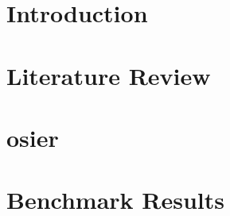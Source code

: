 \chapter{Introduction}
\chapter{Literature Review}
\label{chapter:lit-review}


\chapter{\acf{osier}}
\label{chapter:osier}
% 


\chapter{Benchmark Results}
\label{chapter:benchmark-results}








